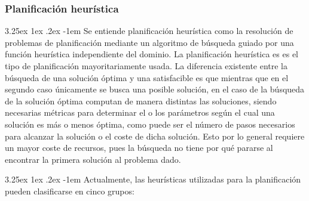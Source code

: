 \documentclass{article}
\makeatletter
\renewcommand\paragraph{\@startsection{paragraph}{5}{\z@}%
      {3.25ex \@plus1ex \@minus.2ex}%
      {-1em}%
      {\normalfont\normalsize\bfseries}}
\makeatother
\begin{document}
    
            \subsubsection{Planificación heurística}
    
    
    \paragraph{}
    Se entiende planificación heurística como la resolución de problemas de planificación mediante un algoritmo de búsqueda guiado por una función heurística independiente del dominio\cite{DeLaRosa}. La planificación heurística es es el tipo de planificación mayoritariamente usada\cite{solOptima}. La diferencia existente entre la búsqueda de una solución óptima y una satisfacible es que mientras que en el segundo caso únicamente se busca una posible solución, en el caso de la búsqueda de la solución óptima computan de manera distintas las soluciones, siendo necesarias métricas para determinar el o los parámetros según el cual una solución es más o menos óptima, como puede ser el número de pasos necesarios para alcanzar la solución o el coste de dicha solución. Esto por lo general requiere un mayor coste de recursos, pues la búsqueda no tiene por qué pararse al encontrar la primera solución al problema dado.
    
    \paragraph{}
    Actualmente, las heurísticas utilizadas para la planificación pueden clasificarse en cinco grupos\cite{gruposHeuristicas}:
    
\end{document}
